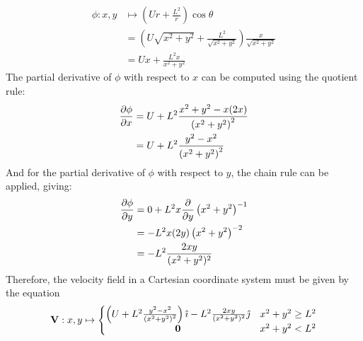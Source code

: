 \begin{align*}
    \phi:x,y&\mapsto\left(Ur+\frac{L^2}{r}\right)\cos\theta\\
    &=\left(U\sqrt{x^2+y^2}+\frac{L^2}{\sqrt{x^2+y^2}}\right)\frac{x}{\sqrt{x^2+y^2}}\\
    &=Ux+\frac{L^2x}{x^2+y^2}
\end{align*}
The partial derivative of $\phi$ with respect to $x$ can be computed using the quotient rule:
\begin{align*}
    \pdv{\phi}{x}&=U+L^2\frac{x^2+y^2-x(2x)}{\left(x^2+y^2\right)^2}\\
    &=U+L^2\frac{y^2-x^2}{\left(x^2+y^2\right)^2}
\end{align*}
And for the partial derivative of $\phi$ with respect to $y$, the chain rule can be applied, giving:
\begin{align*}
    \pdv{\phi}{y}&=0+L^2x\pdv{y}\left(x^2+y^2\right)^{-1}\\
    &=-L^2x(2y)\left(x^2+y^2\right)^{-2}\\
    &=-L^2\frac{2xy}{(x^2+y^2)^2}
\end{align*}
Therefore, the velocity field in a Cartesian coordinate system must be given by the equation
\begin{equation}\label{equation:VELOCITY:CARTESIAN} 
    \mathbf{V}:x,y\mapsto\left\{\begin{matrix}
        \left(U+L^2\frac{y^2-x^2}{\left(x^2+y^2\right)^2}\right)\hat{\imath}-L^2\frac{2xy}{(x^2+y^2)^2}\hat{\jmath}&x^2+y^2\geq L^2\\
        \mathbf{0}&x^2+y^2<L^2
    \end{matrix}\right.
\end{equation}

